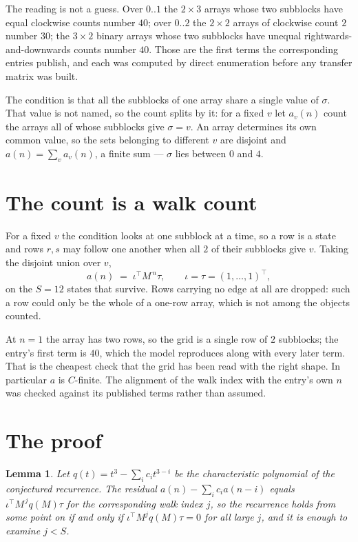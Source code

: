 \documentclass[11pt,a4paper]{article}
\theoremstyle{plain}
\newtheorem{lemma}[theorem]{Lemma}
\theoremstyle{definition}
\begin{document}
The reading is not a guess. Over $0..1$ the $2\times3$ arrays whose two subblocks have equal
clockwise counts number $40$; over $0..2$ the $2\times2$ arrays of clockwise count $2$ number
$30$; the $3\times2$ binary arrays whose two subblocks have unequal rightwards-and-downwards
counts number $40$. Those are the first terms the corresponding entries publish, and each was
computed by direct enumeration before any transfer matrix was built.

The condition is that all the subblocks of one array share a single value of $\sigma$. That
value is not named, so the count splits by it: for a fixed $v$ let $a_v(n)$ count the arrays all
of whose subblocks give $\sigma=v$. An array determines its own common value, so the sets
belonging to different $v$ are disjoint and $a(n)=\sum_v a_v(n)$, a finite sum --- $\sigma$
lies between $0$ and $4$.

\section{The count is a walk count}

For a fixed $v$ the condition looks at one subblock at a time, so a row is
a state and rows $r,s$ may follow one another when all $2$ of their subblocks give $v$.
Taking the disjoint union over $v$,
\[
a(n)\;=\;\iota^{\!\top}M^{\,n}\tau,\qquad\iota=\tau=(1,\dots,1)^{\!\top},
\]
on the $S=12$ states that survive. Rows carrying no edge at all are dropped: such a row could
only be the whole of a one-row array, which is not among the objects counted.

At $n=1$ the array has two rows, so the grid is a single row of $2$
subblocks; the entry's first term is $40$, which the model
reproduces along with every later term. That is the cheapest check that the grid has been read
with the right shape.
In particular $a$ is $C$-finite. The alignment of the walk index with the entry's own $n$ was
checked against its published terms rather than assumed.

\section{The proof}

\begin{lemma}\label{lem:crit}
Let $q(t)=t^{3}-\sum_i c_it^{3-i}$ be the characteristic polynomial of the
conjectured recurrence. The residual $a(n)-\sum_ic_ia(n-i)$ equals
$\iota^{\!\top}M^{\,j}q(M)\tau$ for the corresponding walk index $j$, so the recurrence
holds from some point on if and only if $\iota^{\!\top}M^{j}q(M)\tau=0$ for all large $j$,
and it is enough to examine $j<S$.
\end{lemma}
\end{document}
